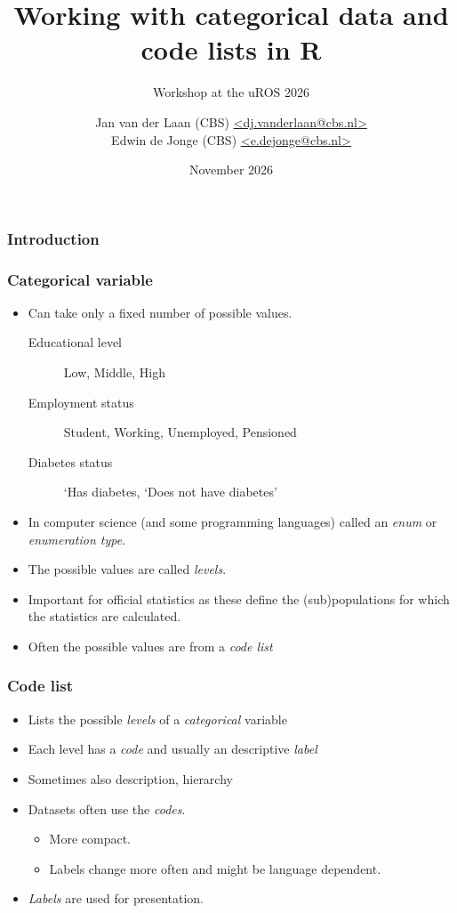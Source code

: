 \documentclass[aspectratio=1610]{beamer}
\title{Working with categorical data and \\code lists in R}
\subtitle{Workshop at the uROS 2026}
\author{Jan van der Laan (CBS) \url{<dj.vanderlaan@cbs.nl>}\\Edwin de Jonge (CBS) \url{<e.dejonge@cbs.nl>}}
\date{November 2026}
\institute{uRos November 2026}
\begin{document}
\begin{frame}
  \titlepage
\end{frame}

\invert
\begin{frame}
 \frametitle{Introduction}
\end{frame}
\revert

\begin{frame}
  \frametitle{Categorical variable}
  \begin{itemize}
    \item Can take only a fixed number of possible values.
    \begin{description}
      \item[Educational level] Low, Middle, High
      \item[Employment status] Student, Working, Unemployed, Pensioned
      \item[Diabetes status] `Has diabetes, `Does not have diabetes'
    \end{description}
    \item In computer science (and some programming languages) called an \emph{enum} or 
      \textit{enumeration type}. 
    \item The possible values are called \emph{levels}.
    \item Important for official statistics as these define the
      (sub)populations for which the statistics are calculated.
    \item Often the possible values are from a \emph{code list}
  \end{itemize}
\end{frame}

\begin{frame}
  \frametitle{Code list}
  \begin{itemize}
    \item Lists the possible \emph{levels} of a \emph{categorical} variable
    \item Each level has a \emph{code} and usually an descriptive \emph{label}
    \item Sometimes also description, hierarchy
    \item Datasets often use the \emph{codes}.
      \begin{itemize}
        \item More compact.
        \item Labels change more often and might be language dependent.
      \end{itemize}
    \item \emph{Labels} are used for presentation.
  \end{itemize}
\end{frame}
\end{document}
